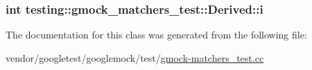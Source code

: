 \subsubsection[{\texorpdfstring{i}{i}}]{\setlength{\rightskip}{0pt plus 5cm}int testing\+::gmock\+\_\+matchers\+\_\+test\+::\+Derived\+::i}\hypertarget{classtesting_1_1gmock__matchers__test_1_1Derived_a357d6747c44d7af7159fb5898a782f1b}{}\label{classtesting_1_1gmock__matchers__test_1_1Derived_a357d6747c44d7af7159fb5898a782f1b}


The documentation for this class was generated from the following file\+:\begin{DoxyCompactItemize}
\item 
vendor/googletest/googlemock/test/\hyperlink{gmock-matchers__test_8cc}{gmock-\/matchers\+\_\+test.\+cc}\end{DoxyCompactItemize}

